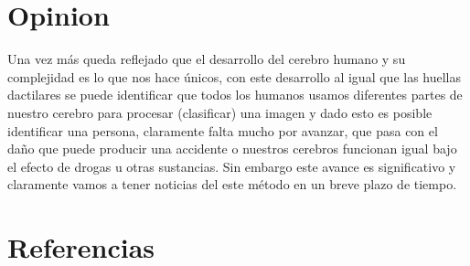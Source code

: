 \documentclass[12pt,letterpaper]{article}
\begin{document}
\section{Opinion}
Una vez más queda reflejado que el desarrollo del cerebro humano y su complejidad es lo que nos hace únicos, con este desarrollo al igual que las huellas dactilares se puede identificar que todos los humanos usamos diferentes partes de nuestro cerebro para procesar (clasificar) una imagen y dado esto es posible identificar una persona, claramente falta mucho por avanzar, que pasa con el daño que puede producir una accidente o  nuestros cerebros funcionan igual bajo el efecto de drogas u otras sustancias. Sin embargo este avance es significativo y claramente vamos a tener noticias del este método en un breve plazo de tiempo.

\section{Referencias\label{sec:references}}

\printbibliography[heading=none]
\end{document}
